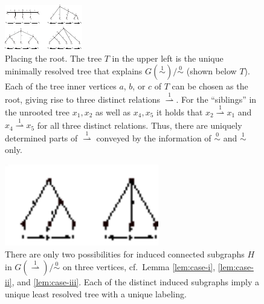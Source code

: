 \documentclass[smallextended]{svjour3}
\newcommand{\Ro}{\mathrel{\overset{0}{\sim}}}
\newcommand{\Rl}{\mathrel{\overset{1}{\sim}}}
\newcommand{\Rld}{\mathrel{\overset{1}{\rightharpoonup}}}
\begin{document}
\begin{figure}[t]
\begin{center}
\includegraphics[width=\textwidth]{fig4.pdf}
\end{center}
\caption{
	Placing the root. The tree $T$ in the upper left 
	is the unique minimally resolved tree that explains 
   $G(\Rl)/\Ro$ (shown below $T$). 
  Each of the tree inner vertices $a$, $b$, or $c$  of $T$ can
  be chosen as the root, giving rise to three distinct relations $\Rld$.
  For the ``siblings'' in the unrooted tree $x_1,x_2$ as well as $x_4,x_5$
  it holds that $x_2\Rld x_1$ and $x_4\Rld x_5$ for all three distinct
  relations.  Thus, there are uniquely determined parts of $\Rld$ conveyed
  by the information of $\Ro$ and $\Rl$ only.}
\label{fig:root}
\end{figure} 
\begin{figure}[t]
\begin{center}
\includegraphics[width=0.6\textwidth]{fig5.eps}
\end{center}
\caption{There are only two possibilities for induced connected subgraphs
  $H$ in $G(\Rld)/\Ro$ on three vertices, cf.\ Lemma \ref{lem:case-i},
  \ref{lem:case-ii}, and \ref{lem:case-iii}.  Each of the distinct induced
  subgraphs imply a unique least resolved tree with a unique labeling.}
\label{fig:2cases}
\end{figure} 
\end{document}
